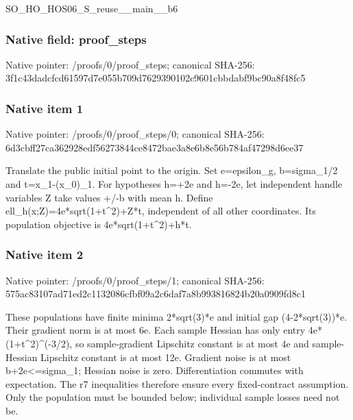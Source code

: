 \documentclass[10pt,a4paper]{article}
\begin{document}
\begingroup\raggedright\sloppy SO\_\allowbreak{}HO\_\allowbreak{}HOS06\_\allowbreak{}S\_\allowbreak{}reuse\_\allowbreak{}\_\allowbreak{}main\_\allowbreak{}\_\allowbreak{}b6\par\endgroup

\subsubsection{Native field: proof\_\allowbreak{}steps}
Native pointer: /proofs/0/proof\_\allowbreak{}steps; canonical SHA-256: 3f1c43dadcfcd61597d7e055b709d7629390102c9601cbbdabf9bc90a8f48fc5

\subsubsection{Native item 1}
Native pointer: /proofs/0/proof\_\allowbreak{}steps/0; canonical SHA-256: 6d3cbff27ca362928edf56273844ce8472bae3a8e6b8e56b784af47298d6ee37

\begingroup\raggedright\sloppy Translate the public initial point to the origin. Set e=\allowbreak{}epsilon\_\allowbreak{}g,\allowbreak{} b=\allowbreak{}sigma\_\allowbreak{}1/\allowbreak{}2 and t=\allowbreak{}x\_\allowbreak{}1-(x\_\allowbreak{}0)\_\allowbreak{}1. For hypotheses h=\allowbreak{}+2e and h=\allowbreak{}-2e,\allowbreak{} let independent handle variables Z take values +/\allowbreak{}-b with mean h. Define ell\_\allowbreak{}h(x;\allowbreak{}Z)=\allowbreak{}4e*sqrt(1+t\textasciicircum{}2)+Z*t,\allowbreak{} independent of all other coordinates. Its population objective is 4e*sqrt(1+t\textasciicircum{}2)+h*t.\par\endgroup

\subsubsection{Native item 2}
Native pointer: /proofs/0/proof\_\allowbreak{}steps/1; canonical SHA-256: 575ac83107ad71ed2c1132086cfbf09a2c6daf7a8b993816824b20a0909fd8c1

\begingroup\raggedright\sloppy These populations have finite minima 2*sqrt(3)*e and initial gap (4-2*sqrt(3))*e. Their gradient norm is at most 6e. Each sample Hessian has only entry 4e*(1+t\textasciicircum{}2)\textasciicircum{}(-3/\allowbreak{}2),\allowbreak{} so sample-gradient Lipschitz constant is at most 4e and sample-Hessian Lipschitz constant is at most 12e. Gradient noise is at most b+2e<=\allowbreak{}sigma\_\allowbreak{}1;\allowbreak{} Hessian noise is zero. Differentiation commutes with expectation. The r7 inequalities therefore ensure every fixed-contract assumption. Only the population must be bounded below;\allowbreak{} individual sample losses need not be.\par\endgroup
\end{document}

